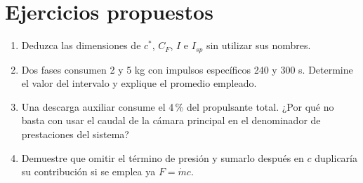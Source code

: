 \section{Ejercicios propuestos}
\begin{enumerate}
\item Deduzca las dimensiones de $c^*$, $C_F$, $I$ e $I_{sp}$ sin utilizar sus nombres.
\item Dos fases consumen 2 y 5 kg con impulsos específicos 240 y 300 s. Determine el valor del intervalo y explique el promedio empleado.
\item Una descarga auxiliar consume el 4\,\% del propulsante total. ¿Por qué no basta con usar el caudal de la cámara principal en el denominador de prestaciones del sistema?
\item Demuestre que omitir el término de presión y sumarlo después en $c$ duplicaría su contribución si se emplea ya $F=\dot m c$.
\end{enumerate}
